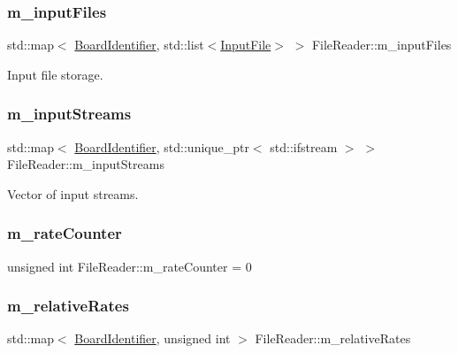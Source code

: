 \subsubsection{\texorpdfstring{m\+\_\+input\+Files}{m\_inputFiles}}
{\footnotesize\ttfamily std\+::map$<$ \hyperlink{class_board_identifier}{Board\+Identifier}, std\+::list$<$\hyperlink{class_input_file}{Input\+File}$>$ $>$ File\+Reader\+::m\+\_\+input\+Files\hspace{0.3cm}{\ttfamily [private]}}



Input file storage. 

\mbox{\label{class_file_reader_ad24e41220e68e1857fdef7df35c1d2da}} 
\subsubsection{\texorpdfstring{m\+\_\+input\+Streams}{m\_inputStreams}}
{\footnotesize\ttfamily std\+::map$<$ \hyperlink{class_board_identifier}{Board\+Identifier}, std\+::unique\+\_\+ptr$<$ std\+::ifstream $>$ $>$ File\+Reader\+::m\+\_\+input\+Streams\hspace{0.3cm}{\ttfamily [private]}}



Vector of input streams. 

\mbox{\label{class_file_reader_a2e6b51dae972af878f7751f2b6a54d75}} 
\subsubsection{\texorpdfstring{m\+\_\+rate\+Counter}{m\_rateCounter}}
{\footnotesize\ttfamily unsigned int File\+Reader\+::m\+\_\+rate\+Counter = 0\hspace{0.3cm}{\ttfamily [private]}}

\mbox{\label{class_file_reader_ab00c6ff706d8cee9ee064f9cc3258d08}} 
\subsubsection{\texorpdfstring{m\+\_\+relative\+Rates}{m\_relativeRates}}
{\footnotesize\ttfamily std\+::map$<$ \hyperlink{class_board_identifier}{Board\+Identifier}, unsigned int $>$ File\+Reader\+::m\+\_\+relative\+Rates\hspace{0.3cm}{\ttfamily [private]}}

